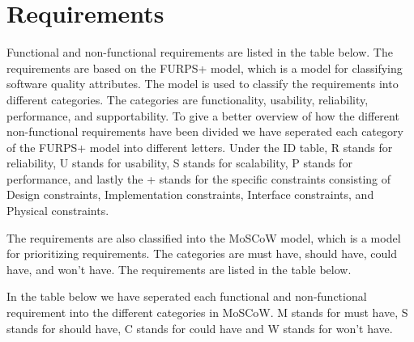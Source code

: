 
\section{Requirements}

Functional and non-functional\cite{example} requirements are listed in the table below. The requirements are based on the FURPS+ model, which is a model for classifying software quality attributes. The model is used to classify the requirements into different categories. The categories are functionality, usability, reliability, performance, and supportability.
To give a better overview of how the different non-functional requirements have been divided we have seperated each category of the FURPS+ model into different letters. Under the ID table, R stands for reliability, U stands for usability, S stands for scalability, P stands for performance, and lastly the + stands for the specific constraints consisting of Design constraints, Implementation constraints, Interface constraints, and Physical constraints. \newline

The requirements are also classified into the MoSCoW model, which is a model for prioritizing requirements. The categories are must have, should have, could have, and won't have. The requirements are listed in the table below. \newline

In the table below we have seperated each functional and non-functional requirement into the different categories in MoSCoW. M stands for must have, S stands for should have, C stands for could have and W stands for won't have.\newline

